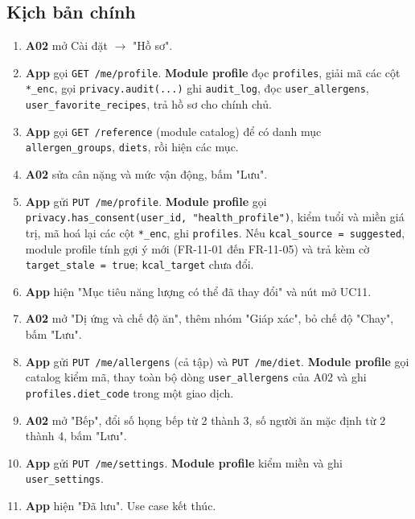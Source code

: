 \subsection{Kịch bản chính}
\begin{enumerate}
\item \textbf{A02} mở Cài đặt \ensuremath{\rightarrow} "Hồ sơ".
\item \textbf{App} gọi {\small\texttt{GET /\allowbreak{}\allowbreak{}me/\allowbreak{}\allowbreak{}profile}}. \textbf{Module profile} đọc {\small\texttt{profiles}}, giải mã các cột {\small\texttt{*\_\allowbreak{}\allowbreak{}enc}}, gọi {\small\texttt{privacy.\allowbreak{}audit(.\allowbreak{}.\allowbreak{}.\allowbreak{})}} ghi {\small\texttt{audit\_\allowbreak{}\allowbreak{}log}}, đọc {\small\texttt{user\_\allowbreak{}\allowbreak{}allergens}}, {\small\texttt{user\_\allowbreak{}\allowbreak{}favorite\_\allowbreak{}\allowbreak{}recipes}}, trả hồ sơ cho chính chủ.
\item \textbf{App} gọi {\small\texttt{GET /\allowbreak{}\allowbreak{}reference}} (module catalog) để có danh mục {\small\texttt{allergen\_\allowbreak{}\allowbreak{}groups}}, {\small\texttt{diets}}, rồi hiện các mục.
\item \textbf{A02} sửa cân nặng và mức vận động, bấm "Lưu".
\item \textbf{App} gửi {\small\texttt{PUT /\allowbreak{}\allowbreak{}me/\allowbreak{}\allowbreak{}profile}}. \textbf{Module profile} gọi {\small\texttt{privacy.\allowbreak{}has\_\allowbreak{}\allowbreak{}consent(user\_\allowbreak{}\allowbreak{}id, "health\_\allowbreak{}\allowbreak{}profile")}}, kiểm tuổi và miền giá trị, mã hoá lại các cột {\small\texttt{*\_\allowbreak{}\allowbreak{}enc}}, ghi {\small\texttt{profiles}}. Nếu {\small\texttt{kcal\_\allowbreak{}\allowbreak{}source = suggested}}, module profile tính gợi ý mới (FR-\allowbreak{}11-\allowbreak{}01 đến FR-\allowbreak{}11-\allowbreak{}05) và trả kèm cờ {\small\texttt{target\_\allowbreak{}\allowbreak{}stale = true}}; {\small\texttt{kcal\_\allowbreak{}\allowbreak{}target}} chưa đổi.
\item \textbf{App} hiện "Mục tiêu năng lượng có thể đã thay đổi" và nút mở UC11.
\item \textbf{A02} mở "Dị ứng và chế độ ăn", thêm nhóm "Giáp xác", bỏ chế độ "Chay", bấm "Lưu".
\item \textbf{App} gửi {\small\texttt{PUT /\allowbreak{}\allowbreak{}me/\allowbreak{}\allowbreak{}allergens}} (cả tập) và {\small\texttt{PUT /\allowbreak{}\allowbreak{}me/\allowbreak{}\allowbreak{}diet}}. \textbf{Module profile} gọi catalog kiểm mã, thay toàn bộ dòng {\small\texttt{user\_\allowbreak{}\allowbreak{}allergens}} của A02 và ghi {\small\texttt{profiles.\allowbreak{}diet\_\allowbreak{}\allowbreak{}code}} trong một giao dịch.
\item \textbf{A02} mở "Bếp", đổi số họng bếp từ 2 thành 3, số người ăn mặc định từ 2 thành 4, bấm "Lưu".
\item \textbf{App} gửi {\small\texttt{PUT /\allowbreak{}\allowbreak{}me/\allowbreak{}\allowbreak{}settings}}. \textbf{Module profile} kiểm miền và ghi {\small\texttt{user\_\allowbreak{}\allowbreak{}settings}}.
\item \textbf{App} hiện "Đã lưu". Use case kết thúc.
\end{enumerate}
